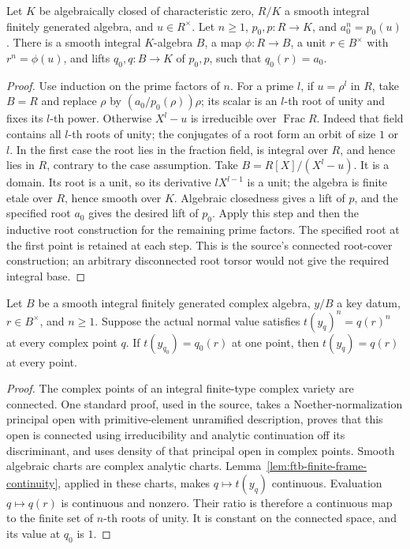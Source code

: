 \begin{srlemma}
\label{lem:ftb-key-connected-root-cover}
Let \(K\) be algebraically closed of characteristic zero,
\(R/K\) a smooth integral finitely generated algebra, and
\(u\in R^\times\).  Let \(n\geq1\), \(p_0,p:R\to K\), and
\(a_0^n=p_0(u)\).
There is a smooth integral \(K\)-algebra \(B\), a map
\(\phi:R\to B\), a unit \(r\in B^\times\) with
\(r^n=\phi(u)\), and lifts \(q_0,q:B\to K\) of \(p_0,p\),
such that \(q_0(r)=a_0\).
\end{srlemma}
\begin{proof}
Use induction on the prime factors of \(n\).
For a prime \(l\), if \(u=\rho^l\) in \(R\), take \(B=R\)
and replace \(\rho\) by
\((a_0/p_0(\rho))\rho\); its scalar is an \(l\)-th root of
unity and fixes its \(l\)-th power.
Otherwise \(X^l-u\) is irreducible over \(\operatorname{Frac}R\).
Indeed that field contains all \(l\)-th roots of unity; the
conjugates of a root form an orbit of size \(1\) or \(l\).
In the first case the root lies in the fraction field, is
integral over \(R\), and hence lies in \(R\), contrary to the
case assumption.
Take \(B=R[X]/(X^l-u)\).  It is a domain.
Its root is a unit, so its derivative \(lX^{l-1}\) is a unit;
the algebra is finite etale over \(R\), hence smooth over \(K\).
Algebraic closedness gives a lift of \(p\), and the specified
root \(a_0\) gives the desired lift of \(p_0\).
Apply this step and then the inductive root construction for
the remaining prime factors.  The specified root at the first
point is retained at each step.  This is the source's connected
root-cover construction; an arbitrary disconnected root torsor
would not give the required integral base.
\end{proof}

\begin{srlemma}
\label{lem:ftb-root-fixed-by-point}
Let \(B\) be a smooth integral finitely generated complex algebra,
\(y/B\) a key datum, \(r\in B^\times\), and \(n\geq1\).
Suppose the actual normal value satisfies
\(t(y_q)^n=q(r)^n\) at every complex point \(q\).
If \(t(y_{q_0})=q_0(r)\) at one point, then
\(t(y_q)=q(r)\) at every point.
\end{srlemma}
\begin{proof}
The complex points of an integral finite-type complex variety
are connected.  One standard proof, used in the source, takes
a Noether-normalization principal open with primitive-element
unramified description, proves that this open is connected
using irreducibility and analytic continuation off its
discriminant, and uses density of that principal open in
complex points.
Smooth algebraic charts are complex analytic charts.
Lemma~\ref{lem:ftb-finite-frame-continuity}, applied in these
charts, makes \(q\mapsto t(y_q)\) continuous.
Evaluation \(q\mapsto q(r)\) is continuous and nonzero.
Their ratio is therefore a continuous map to the finite set
of \(n\)-th roots of unity.  It is constant on the connected
space, and its value at \(q_0\) is \(1\).
\end{proof}

